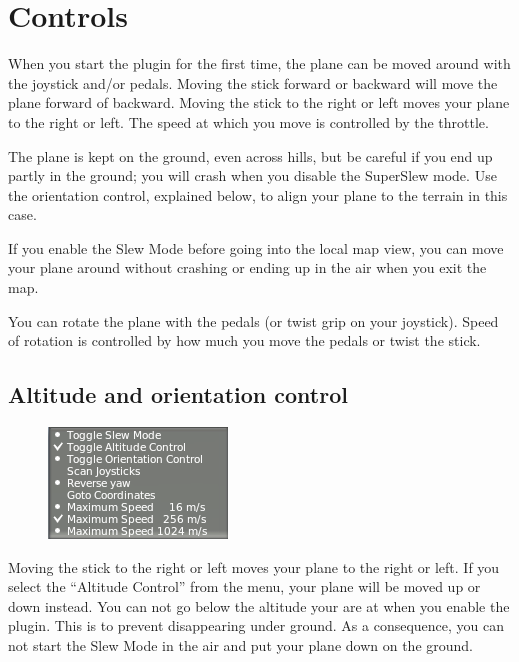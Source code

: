 \documentclass[a4paper,12pt]{article}
\begin{document}
\clearpage
\section*{Controls}

When you start the plugin for the first time, the plane can be moved
around with the joystick and/or pedals. Moving the stick forward or
backward will move the plane forward of backward. Moving the stick to
the right or left moves your plane to the right or left.  The speed at
which you move is controlled by the throttle.

The plane is kept on the ground, even across hills, but be careful if you end up
partly in the ground; you will crash when you disable the SuperSlew mode. Use
the orientation control, explained below, to align your plane to the terrain in
this case.

If you enable the Slew Mode before going into the local map view, you
can move your plane around without crashing or ending up in the air
when you exit the map.

\vspace{0.5\baselineskip}
You can rotate the plane with the pedals (or twist grip on your
joystick). Speed of rotation is controlled by how much you move the
pedals or twist the stick.

\subsection*{Altitude and orientation control}

\begin{figure}[h!]%
\centering
\includegraphics[scale=1]{slewaltitude.png}
\label{fig:slewaltitude}
\end{figure}

Moving the stick to the right or left moves your plane to the right or
left. If you select the ``Altitude Control'' from the menu, your plane
will be moved up or down instead. You can not go below the altitude
your are at when you enable the plugin. This is to prevent
disappearing under ground. As a consequence, you can not start the
Slew Mode in the air and put your plane down on the ground.
\end{document}
